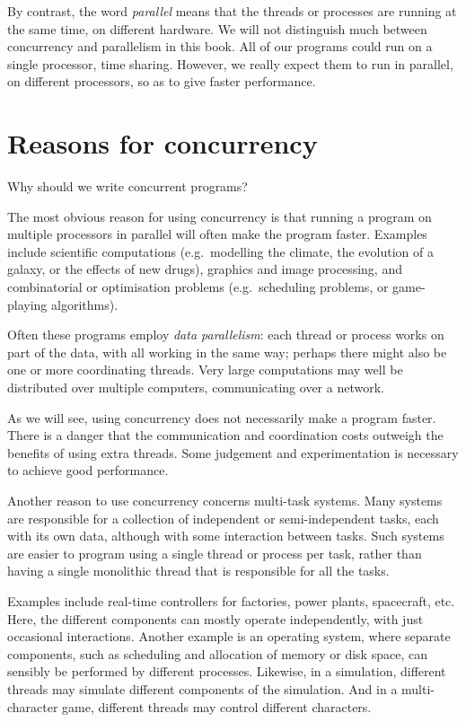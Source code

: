By contrast, the word \emph{parallel} means that the threads or processes are
running at the same time, on different hardware.  We will not distinguish much
between concurrency and parallelism in this book.  All of our programs could
run on a single processor, time sharing.  However, we really expect them to
run in parallel, on different processors, so as to give faster performance.


\section{Reasons for concurrency}

Why should we write concurrent programs?

The most obvious reason for using concurrency is that running a program on
multiple processors in parallel will often make the program faster.  Examples
include scientific computations (e.g.~modelling the climate, the evolution of
a galaxy, or the effects of new drugs), graphics and image processing, and
combinatorial or optimisation problems (e.g.~scheduling problems, or
game-playing algorithms).  

Often these programs employ \emph{data parallelism}: each thread or process
works on part of the data, with all working in the same way; perhaps there
might also be one or more coordinating threads.  Very large computations may
well be distributed over multiple computers, communicating over a network.

As we will see, using concurrency does not necessarily make a program faster.
There is a danger that the communication and coordination costs outweigh the
benefits of using extra threads.  Some judgement and experimentation is
necessary to achieve good performance. 


Another reason to use concurrency concerns multi-task systems.  Many systems
are responsible for a collection of independent or semi-independent tasks,
each with its own data, although with some interaction between tasks.  Such
systems are easier to program using a single thread or process per task,
rather than having a single monolithic thread that is responsible for all the
tasks.

Examples include real-time controllers for factories, power plants,
spacecraft, etc.  Here, the different components can mostly operate
independently, with just occasional interactions.  Another example is an
operating system, where separate components, such as scheduling and allocation
of memory or disk space, can sensibly be performed by different processes.
Likewise, in a simulation, different threads may simulate different components
of the simulation.  And in a multi-character game, different threads may
control different characters.

